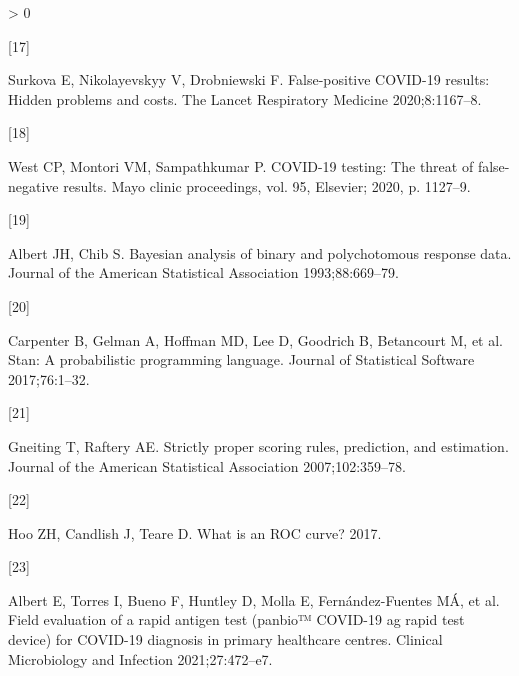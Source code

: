 \documentclass[]{elsarticle} %
\newlength{\cslhangindent}
\newlength{\csllabelwidth}
\newenvironment{CSLReferences}[2] %
 {%
  \setlength{\parindent}{0pt}
  \ifodd #1 \everypar{\setlength{\hangindent}{\cslhangindent}}\ignorespaces\fi
  \ifnum #2 > 0
  \setlength{\parskip}{#2\baselineskip}
  \fi
 }%
 {}
\newcommand{\CSLLeftMargin}[1]{\parbox[t]{\csllabelwidth}{#1}}
\newcommand{\CSLRightInline}[1]{\parbox[t]{\linewidth - \csllabelwidth}{#1}\break}
\begin{document}
\begin{CSLReferences}{0}{0}
\leavevmode\hypertarget{ref-surkova2020false}{}%
\CSLLeftMargin{{[}17{]} }
\CSLRightInline{Surkova E, Nikolayevskyy V, Drobniewski F. False-positive COVID-19 results: Hidden problems and costs. The Lancet Respiratory Medicine 2020;8:1167--8.}

\leavevmode\hypertarget{ref-west2020covid}{}%
\CSLLeftMargin{{[}18{]} }
\CSLRightInline{West CP, Montori VM, Sampathkumar P. COVID-19 testing: The threat of false-negative results. Mayo clinic proceedings, vol. 95, Elsevier; 2020, p. 1127--9.}

\leavevmode\hypertarget{ref-albert1993bayesian}{}%
\CSLLeftMargin{{[}19{]} }
\CSLRightInline{Albert JH, Chib S. Bayesian analysis of binary and polychotomous response data. Journal of the American Statistical Association 1993;88:669--79.}

\leavevmode\hypertarget{ref-carpenter2017stan}{}%
\CSLLeftMargin{{[}20{]} }
\CSLRightInline{Carpenter B, Gelman A, Hoffman MD, Lee D, Goodrich B, Betancourt M, et al. Stan: A probabilistic programming language. Journal of Statistical Software 2017;76:1--32.}

\leavevmode\hypertarget{ref-gneiting2007strictly}{}%
\CSLLeftMargin{{[}21{]} }
\CSLRightInline{Gneiting T, Raftery AE. Strictly proper scoring rules, prediction, and estimation. Journal of the American Statistical Association 2007;102:359--78.}

\leavevmode\hypertarget{ref-hoo2017roc}{}%
\CSLLeftMargin{{[}22{]} }
\CSLRightInline{Hoo ZH, Candlish J, Teare D. What is an ROC curve? 2017.}

\leavevmode\hypertarget{ref-albert2021field}{}%
\CSLLeftMargin{{[}23{]} }
\CSLRightInline{Albert E, Torres I, Bueno F, Huntley D, Molla E, Fernández-Fuentes MÁ, et al. Field evaluation of a rapid antigen test (panbio™ COVID-19 ag rapid test device) for COVID-19 diagnosis in primary healthcare centres. Clinical Microbiology and Infection 2021;27:472--e7.}

\end{CSLReferences}
\end{document}
